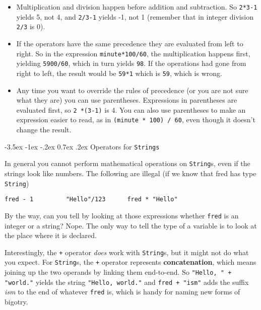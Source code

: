 \documentclass{book}
\makeatletter
\renewcommand{\section}{\@startsection 
    {section} {1} {0mm}%
    {-3.5ex \@plus -1ex \@minus -.2ex}%
    {0.7ex \@plus.2ex}%
    {\normalfont\Large\bfseries}}
\makeatother
\begin{document}
\begin{itemize}

\item Multiplication and division happen before
addition and subtraction.  So {\tt 2*3-1} yields 5, not 4, and
{\tt 2/3-1} yields -1, not 1 (remember that in integer division
{\tt 2/3} is 0).

\item If the operators have the same precedence they are evaluated
from left to right.  So in the expression {\tt minute*100/60},
the multiplication happens first, yielding {\tt 5900/60}, which
in turn yields {\tt 98}.  If the operations had gone from right
to left, the result would be {\tt 59*1} which is {\tt 59}, which
is wrong.

\item Any time you want to override the rules of precedence (or
you are not sure what they are) you can use parentheses.  Expressions
in parentheses are evaluated first, so {\tt 2 *(3-1)} is 4.
You can also use parentheses to make an expression easier to
read, as in {\tt(minute * 100) / 60}, even though it doesn't
change the result.

\end{itemize}


\section{Operators for {\tt Strings}}

In general you cannot perform mathematical operations on {\tt String}s,
even if the strings look like numbers.  The following are
illegal (if we know that fred has type {\tt String})

\begin{verbatim}
fred - 1         "Hello"/123      fred * "Hello"
\end{verbatim}
%
By the way, can you tell by looking at those expressions
whether {\tt fred} is an integer or a string?  Nope.
The only way to tell the type of a variable is to look at
the place where it is declared.


Interestingly, the {\tt +} operator {\em does} work with
{\tt String}s, but it might not do what you expect.
For {\tt String}s, the {\tt +} operator represents {\bf concatenation},
which means joining up the two operands by linking them
end-to-end.  So {\tt "Hello, " + "world."} yields the string
{\tt "Hello, world."} and {\tt fred + "ism"} adds the suffix
{\em ism} to the end of whatever {\tt fred} is, which is
handy for naming new forms of bigotry.
\end{document}
